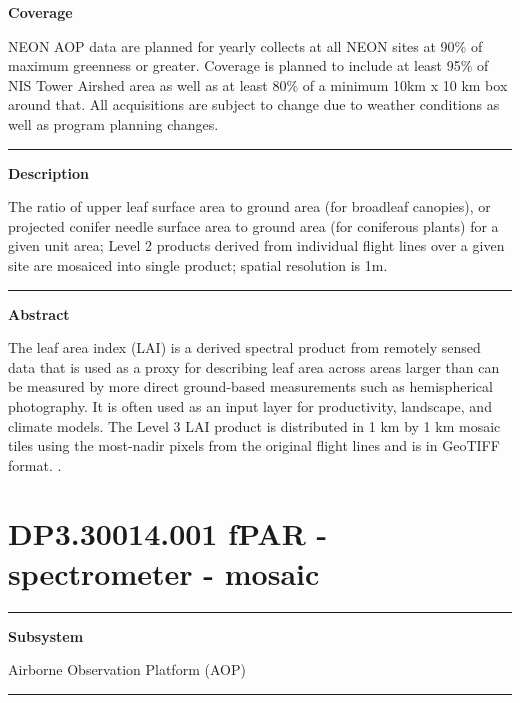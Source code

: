 \documentclass[]{article}
\begin{document}
\textbf{Coverage}

NEON AOP data are planned for yearly collects at all NEON sites at 90\%
of maximum greenness or greater. Coverage is planned to include at least
95\% of NIS Tower Airshed area as well as at least 80\% of a minimum
10km x 10 km box around that. All acquisitions are subject to change due
to weather conditions as well as program planning changes.

\begin{center}\rule{0.5\linewidth}{\linethickness}\end{center}

\textbf{Description}

The ratio of upper leaf surface area to ground area (for broadleaf
canopies), or projected conifer needle surface area to ground area (for
coniferous plants) for a given unit area; Level 2 products derived from
individual flight lines over a given site are mosaiced into single
product; spatial resolution is 1m.

\begin{center}\rule{0.5\linewidth}{\linethickness}\end{center}

\textbf{Abstract}

The leaf area index (LAI) is a derived spectral product from remotely
sensed data that is used as a proxy for describing leaf area across
areas larger than can be measured by more direct ground-based
measurements such as hemispherical photography. It is often used as an
input layer for productivity, landscape, and climate models. The Level 3
LAI product is distributed in 1 km by 1 km mosaic tiles using the
most-nadir pixels from the original flight lines and is in GeoTIFF
format. \newpage
.

\section{DP3.30014.001 fPAR - spectrometer -
mosaic}\label{dp3.30014.001-fpar---spectrometer---mosaic}

\begin{center}\rule{0.5\linewidth}{\linethickness}\end{center}

\textbf{Subsystem}

Airborne Observation Platform (AOP)

\begin{center}\rule{0.5\linewidth}{\linethickness}\end{center}
\end{document}
